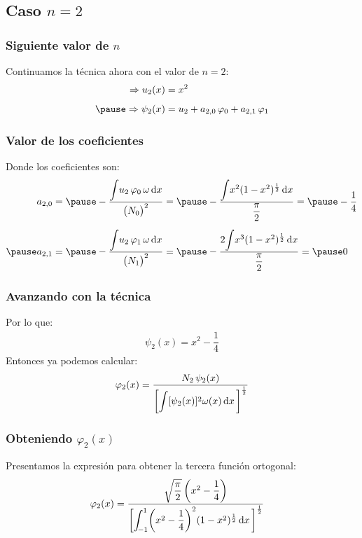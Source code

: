 \documentclass[12pt]{beamer}
\begin{document}
\subsection{Caso \texorpdfstring{$n = 2$}{n = 2}}

\begin{frame}
\frametitle{Siguiente valor de $n$}
Continuamos la técnica ahora con el valor de $n = 2$:
\pause
\begin{eqnarray*}
\begin{aligned}
\Rightarrow u_{2} (x) &= x^{2} \\[0.5em] \pause
\Rightarrow \psi_{2} (x) &=  u_{2} + a_{2,0} \, \varphi_{0} + a_{2,1} \, \varphi_{1}
\end{aligned}
\end{eqnarray*}    
\end{frame}
\begin{frame}
\frametitle{Valor de los coeficientes}
Donde los coeficientes son:
\pause
\begin{eqnarray*}
\begin{aligned}    
a_{2,0} &= \pause - \dfrac{\scaleint{5ex} u_{2} \, \varphi_{0} \, \omega \dd{x}}{\big( N_{0} \big)^{2}} = \pause - \dfrac{\scaleint{5ex} x^{2} (1 - x^{2})^{\frac{1}{2}} \dd{x}}{\dfrac{\pi}{2}} = \pause - \dfrac{1}{4} \\[0.5em] \pause
a_{2,1} &= \pause - \dfrac{\scaleint{5ex} u_{2} \, \varphi_{1} \, \omega \dd{x}}{\big( N_{1} \big)^{2}} = \pause
- \dfrac{2 \scaleint{5ex} x^{3} (1 - x^{2})^{\frac{1}{2}} \dd{x}}{\dfrac{\pi}{2}} = \pause 0
\end{aligned}
\end{eqnarray*}    
\end{frame}
\begin{frame}
\frametitle{Avanzando con la técnica}
Por lo que:
\pause
\begin{align*}
\psi_{2}(x) = x^{2} - \dfrac{1}{4}
\end{align*}
\pause
Entonces ya podemos calcular:
\pause
\begin{align*}
\varphi_{2}(x) = \dfrac{N_{2} \, \psi_{2} (x)}{ \bigg[ \scaleint{5ex} [\psi_{2} (x)]^{2} \omega (x) \dd{x} \bigg]^{\frac{1}{2}}}
\end{align*}
\end{frame}
\begin{frame}
\frametitle{Obteniendo $\varphi_{2}(x)$}
Presentamos la expresión para obtener la tercera función ortogonal:
\pause
\begin{eqnarray*}
\begin{aligned}
\varphi_{2}(x) &= \dfrac{\sqrt{\dfrac{\pi}{2}} \, \bigg( x^{2} - \dfrac{1}{4} \bigg)}{ \bigg[ \scaleint{5ex}_{\bs -1}^{1} \bigg( x^{2} - \dfrac{1}{4} \bigg)^{2} (1 -x^{2})^{\frac{1}{2}} \dd{x} \bigg]^{\frac{1}{2}}}
\end{aligned}
\end{eqnarray*}
\end{frame}
\end{document}
